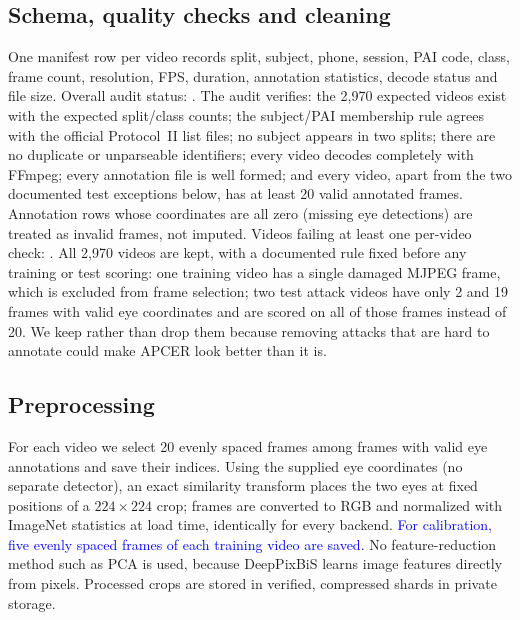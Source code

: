 \documentclass[conference]{IEEEtran}
\newcommand{\scope}[1]{\textcolor{blue}{#1}}
\newcommand{\todo}[1]{\textbf{\textcolor{red}{[#1]}}}
\newcommand{\qpadtable}[1]{\IfFileExists{tables/#1.tex}{}{\todo{INSERT tables/#1.tex}}}
\begin{document}
\begin{table}[!tb]\centering\caption{Protocol II videos per split and class (from the audit manifest).}
\label{tab:counts}\qpadtable{class_counts}\end{table}

\subsection{Schema, quality checks and cleaning}
One manifest row per video records split, subject, phone, session, PAI code, class, frame count, resolution,
FPS, duration, annotation statistics, decode status and file size. Overall audit status:
\textbf{\QPADAuditStatus}. The audit verifies: the 2,970 expected videos exist with the expected split/class
counts; the subject/PAI membership rule agrees with the official Protocol~II list files; no subject appears in
two splits; there are no duplicate or unparseable identifiers; every video decodes completely with FFmpeg; every
annotation file is well formed; and every video, apart from the two documented test exceptions below, has at
least 20 valid annotated frames. Annotation rows whose
coordinates are all zero (missing eye detections) are treated as invalid frames, not imputed.
Videos failing at least one per-video check: \QPADNumFailed{}. All 2,970 videos are kept, with a documented
rule fixed before any training or test scoring: one training video has a single damaged MJPEG frame, which is
excluded from frame selection; two test attack videos have only 2 and 19 frames with valid eye coordinates and
are scored on all of those frames instead of 20. We keep rather than drop them because removing attacks that are
hard to annotate could make APCER look better than it is.

\subsection{Preprocessing}
For each video we select 20 evenly spaced frames among frames with valid eye annotations and save their indices.
Using the supplied eye coordinates (no separate detector), an exact similarity transform places the two eyes at
fixed positions of a $224\times224$ crop; frames are converted to RGB and normalized with ImageNet statistics
at load time, identically for every backend. \scope{For calibration, five evenly spaced frames of each training
video are saved.} No feature-reduction method such as PCA is used, because DeepPixBiS learns image features
directly from pixels. Processed crops are stored in verified, compressed shards in private storage.
\end{document}
